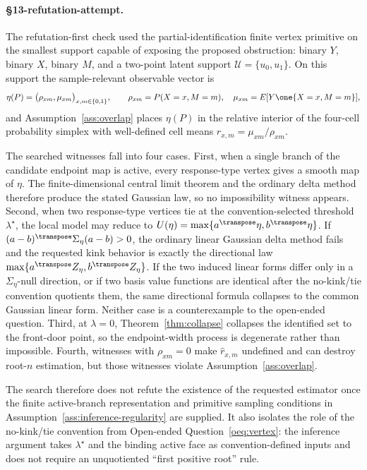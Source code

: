 \paragraph{\S13-refutation-attempt.}
The refutation-first check used the partial-identification finite vertex primitive on
the smallest support capable of exposing the proposed obstruction: binary \(Y\),
binary \(X\), binary \(M\), and a two-point latent support
\(\mathcal U=\{u_0,u_1\}\).  On this support the sample-relevant observable vector is
\[
  \eta(P)=\bigl(\rho_{xm},\mu_{xm}\bigr)_{x,m\in\{0,1\}},
  \qquad
  \rho_{xm}=P(X=x,M=m),\quad
  \mu_{xm}=E[Y\one\{X=x,M=m\}],
\]
and Assumption~\ref{ass:overlap} places \(\eta(P)\) in the relative interior of the
four-cell probability simplex with well-defined cell means
\(r_{x,m}=\mu_{xm}/\rho_{xm}\).

The searched witnesses fall into four cases.  First, when a single branch of the
candidate endpoint map is active, every response-type vertex gives a smooth map of
\(\eta\).  The finite-dimensional central limit theorem and the ordinary delta method
therefore produce the stated Gaussian law, so no impossibility witness appears.
Second, when two response-type vertices tie at the convention-selected threshold
\(\lambda^\star\), the local model may reduce to
\(U(\eta)=\max\{a^\transpose\eta,b^\transpose\eta\}\).  If
\((a-b)^\transpose\Sigma_\eta(a-b)>0\), the ordinary linear Gaussian delta method
fails and the requested kink behavior is exactly the directional law
\(\max\{a^\transpose Z_\eta,b^\transpose Z_\eta\}\).  If the two induced linear
forms differ only in a \(\Sigma_\eta\)-null direction, or if two basis value
functions are identical after the no-kink/tie convention quotients them, the same
directional formula collapses to the common Gaussian linear form.  Neither case is a
counterexample to the open-ended question.  Third, at \(\lambda=0\), Theorem~\ref{thm:collapse}
collapses the identified set to the front-door point, so the endpoint-width process is
degenerate rather than impossible.  Fourth, witnesses with \(\rho_{xm}=0\) make
\(\widehat r_{x,m}\) undefined and can destroy root-\(n\) estimation, but those
witnesses violate Assumption~\ref{ass:overlap}.

The search therefore does not refute the existence of the requested estimator once the
finite active-branch representation and primitive sampling conditions in
Assumption~\ref{ass:inference-regularity} are supplied.  It also isolates the role of
the no-kink/tie convention from Open-ended Question~\ref{oeq:vertex}: the inference
argument takes \(\lambda^\star\) and the binding active face as convention-defined
inputs and does not require an unquotiented ``first positive root'' rule.

